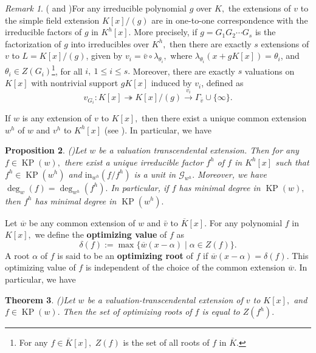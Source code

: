 \documentclass[11pt]{amsart}
\newtheorem{theorem}{Theorem}[section]
\newtheorem{proposition}[theorem]{Proposition}
\theoremstyle{definition}
\theoremstyle{remark}
\newtheorem{remark}[theorem]{Remark}
\numberwithin{equation}{section}
\begin{document}
	\begin{remark}(\cite[Section 17]{O} and \cite[Section 3]{EN3})\label{r21}
	For any irreducible polynomial $g$ over $K,$ the extensions of $v$ to the simple field extension $K[x]/(g)$ are in one-to-one correspondence with the irreducible factors of $g$ in $K^h[x].$ More precisely, if $g=G_1G_2\cdots G_s$ is the factorization of $g$ into irreducibles over $K^h,$ then there are exactly $s$ extensions of $v$ to $L=K[x]/(g)$, given by ${v}_i=\bar{v}\circ \lambda_{\theta_i},$ where $ \lambda_{\theta_i}(x+gK[x])=\theta_i$, and $\theta_i\in Z(G_i)$\footnote{For any $f\in \overline{K}[x],$ $Z(f)$ is the set of all roots of $f$ in $\overline{K}.$}, for all $i,\ 1\leq i \leq s.$
	Moreover, there are  exactly $s$ valuations on $K[x]$ with nontrivial support $gK[x]$ induced by ${v}_i$, defined as 
	\[v_{G_i}:K[x]\twoheadrightarrow K[x]/(g)\xrightarrow{{v}_i} \Gamma_{\bar{v}}\cup\{ \infty \}.\]
\end{remark}

If $w$ is any extension of $v$ to $K[x],$ then there exist a unique common extension $w^h$ of $w$ and $v^h$ to $K^h[x]$ (see \cite[Theorem A]{EN5}). In particular, we have 

\begin{proposition}(\cite[Proposition 5.6]{EN3})\label{df1}
Let $w$ be a valuation transcendental extension. Then for any $f\in\operatorname{KP}(w),$ there exist a unique irreducible factor $f^h$ of $f$ in $K^h[x]$ such that $f^h\in \operatorname{KP}(w^h)$ and $\text{in}_{w^h}(f/f^h)$ is a unit in $\mathcal{G}_{w^h}.$ 
Moreover, we have $\deg_w(f)=\deg_{w^h}(f^h).$ In particular, if $f$ has minimal degree in $\operatorname{KP}(w),$ then $f^h$ has minimal degree in $\operatorname{KP}(w^h).$
\end{proposition}

	Let $\overline{w}$ be any common extension of $w$ and $\bar{v}$ to $\overline{K}[x].$ For any polynomial $f$ in $K[x],$ we define the {\bf optimizing value} of $f$ as
$$\delta(f):=\max\{\overline{w}(x-\alpha)\mid \alpha\in Z(f)\}.$$ A root $\alpha$ of $f$ is said to be an {\bf optimizing root} of $f$ if $\overline{w}(x-\alpha)=\delta(f).$
This optimizing value of $f$ is independent of the choice of the common extension $\overline{w}.$ In particular, we have

  \begin{theorem}(\cite[Corollary 3.13]{EJP})\label{t21}
 	Let $w$ be a valuation-transcendental extension of $v$ to $K[x],$ and $f\in \operatorname{KP}(w).$ Then the set of optimizing roots of $f$ is equal to $Z(f^h).$
 \end{theorem}
 
\end{document}
